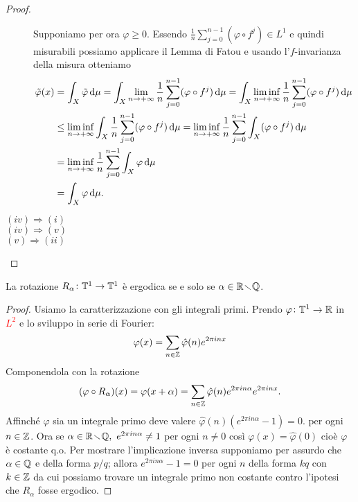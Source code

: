 \begin{proof}
\begin{description}
        Supponiamo per ora $ \varphi \geq 0 $. Essendo $ \frac{1}{n} \sum_{j = 0}^{n-1} (\varphi \circ f^{j}) \in L^1 $ e quindi misurabili possiamo applicare il Lemma di Fatou e usando l'$ f $-invarianza della misura otteniamo
        \begin{align*}
            \tilde{\varphi}(x) & = \int_{X} \tilde{\varphi} \dif{\mu} = \int_{X} \lim_{n \to +\infty} \frac{1}{n} \sum_{j = 0}^{n-1} (\varphi \circ f^{j}) \dif{\mu} = \int_{X} \liminf_{n \to +\infty} \frac{1}{n} \sum_{j = 0}^{n-1} (\varphi \circ f^{j}) \dif{\mu} \\
            & \leq \liminf_{n \to +\infty} \int_{X} \frac{1}{n} \sum_{j = 0}^{n-1} (\varphi \circ f^{j}) \dif{\mu} = \liminf_{n \to +\infty} \frac{1}{n} \sum_{j = 0}^{n-1} \int_{X} (\varphi \circ f^{j}) \dif{\mu} \\
            & = \liminf_{n \to +\infty} \frac{1}{n} \sum_{j = 0}^{n-1} \int_{X} \varphi \dif{\mu} \\
            & = \int_{X} \varphi \dif{\mu}.
        \end{align*}
        \item[$ (iv) \Rightarrow (i) $]
        \item[$ (iv) \Rightarrow (v) $]
        \item[$ (v) \Rightarrow (ii) $]
    \end{description}
\end{proof}

\begin{proposition}\label{prop:rotazioni_erg}
    La rotazione $ R_\alpha \colon \mathbb{T}^1 \to \mathbb{T}^1 $ è ergodica se e solo se $ \alpha \in \mathbb{R} \!\smallsetminus\! \mathbb{Q} $. 
\end{proposition}
\begin{proof}
    Usiamo la caratterizzazione con gli integrali primi. Prendo $ \varphi \colon \mathbb{T}^1 \to \mathbb{R} $ in \textcolor{red}{$ L^2 $} e lo sviluppo in serie di Fourier:
    \[
        \varphi(x) = \sum_{n \in \mathbb{Z}} \hat{\varphi}(n) e^{2\pi i n x}
    \]
    Componendola con la rotazione
    \[
        (\varphi \circ R_\alpha)(x) = \varphi(x + \alpha) = \sum_{n \in \mathbb{Z}} \hat{\varphi}(n) e^{2\pi i n \alpha} e^{2\pi i n x}.
    \]
    Affinché $ \varphi $ sia un integrale primo deve valere $ \hat{\varphi}(n) \left(e^{2\pi i n \alpha} - 1 \right) = 0. $ per ogni $ n \in \mathbb{Z} $.
    Ora se $ \alpha \in \mathbb{R} \!\smallsetminus\! \mathbb{Q}, \ e^{2\pi i n \alpha} \neq 1 $ per ogni $ n \neq 0 $ così $ \varphi(x) = \hat{\varphi}(0) $ cioè $ \varphi $ è costante q.o. Per mostrare l'implicazione inversa supponiamo per assurdo che $ \alpha \in \mathbb{Q} $ e della forma $ p/q $; allora $ e^{2\pi i n \alpha} - 1 = 0 $ per ogni $ n $ della forma $ kq $ con $ k \in \mathbb{Z} $ da cui possiamo trovare un integrale primo non costante contro l'ipotesi che $ R_\alpha $ fosse ergodico.
\end{proof}

